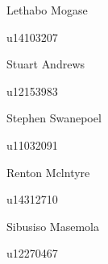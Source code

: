 \documentclass[hidelinks,a4paper,12pt]{article}
\begin{document}
\begin{titlepage}
\begin{center}
			\begin{minipage}{0.4\textwidth}
				\begin{flushleft} \large
					Lethabo {Mogase}
				\end{flushleft}
			\end{minipage}
			\begin{minipage}{0.4\textwidth}
				\begin{flushright} \large
					\emph{}
					u14103207
				\end{flushright}
			\end{minipage}
			
			\begin{minipage}{0.4\textwidth}
				\begin{flushleft} \large
					Stuart {Andrews}
				\end{flushleft}
			\end{minipage}
			\begin{minipage}{0.4\textwidth}
				\begin{flushright} \large
					\emph{}
					u12153983
				\end{flushright}
			\end{minipage}
			
			\begin{minipage}{0.4\textwidth}
				\begin{flushleft} \large
					Stephen {Swanepoel}
				\end{flushleft}
			\end{minipage}
			\begin{minipage}{0.4\textwidth}
				\begin{flushright} \large
					\emph{}
					u11032091
				\end{flushright}
			\end{minipage}
			
			\begin{minipage}{0.4\textwidth}
				\begin{flushleft} \large
					Renton {Mclntyre}
				\end{flushleft}
				\end{minipage}
				\begin{minipage}{0.4\textwidth}
				\begin{flushright} \large
				\emph{}
				u14312710
				\end{flushright}
			\end{minipage}
			
			\begin{minipage}{0.4\textwidth}
				\begin{flushleft} \large
					Sibusiso {Masemola}
				\end{flushleft}
			\end{minipage}
			\begin{minipage}{0.4\textwidth}
				\begin{flushright} \large
					\emph{}
					u12270467
				\end{flushright}
			\end{minipage}

			
			\vfill

		\end{center}
	\end{titlepage}
\end{document}
